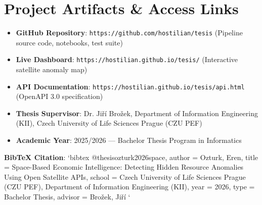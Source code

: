 \section{Project Artifacts \& Access Links}
\begin{itemize}
  \item \textbf{GitHub Repository}: \texttt{https://github.com/hostilian/tesis} (Pipeline source code, notebooks, test suite)
  \item \textbf{Live Dashboard}: \texttt{https://hostilian.github.io/tesis/} (Interactive satellite anomaly map)
  \item \textbf{API Documentation}: \texttt{https://hostilian.github.io/tesis/api.html} (OpenAPI 3.0 specification)
  \item \textbf{Thesis Supervisor}: Dr. Jiří Brožek, Department of Information Engineering (KII), Czech University of Life Sciences Prague (CZU PEF)
  \item \textbf{Academic Year}: 2025/2026 — Bachelor Thesis Program in Informatics

\end{itemize}
\textbf{BibTeX Citation}:
\texttt{}`bibtex
@thesis{ozturk2026space,
  author  = {Ozturk, Eren},
  title   = {Space-Based Economic Intelligence: Detecting Hidden Resource
             Anomalies Using Open Satellite APIs},
  school  = {Czech University of Life Sciences Prague (CZU PEF),
             Department of Information Engineering (KII)},
  year    = {2026},
  type    = {Bachelor Thesis},
  advisor = {Bro{\v{z}}ek, Ji{\v{r}}{\'i}}
}
\texttt{}`
